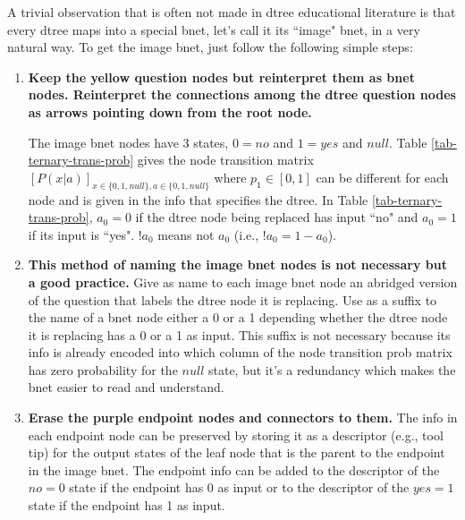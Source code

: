 A trivial 
observation
that is often not made
in dtree educational literature
is that every dtree 
maps into a special bnet, 
let's call it
its ``image" bnet,
in a very natural way.
To get the
 image bnet, just follow the
following simple steps:
\begin{enumerate}
\item {\bf Keep
the yellow question nodes
but reinterpret them as bnet nodes.
Reinterpret the connections among
the dtree question nodes
 as arrows pointing
down from the root node.}

The image bnet nodes
have 3 states,  $0=no$ and
$1=yes$ and $null$.
Table \ref{tab-ternary-trans-prob}
gives the 
node transition matrix $[P(x|a)]_{
x\in \{0,1,null\}, 
a\in \{0,1,null\}}$
where $p_1\in[0,1]$ can be 
different for each node and is given
in the info that specifies    
the dtree. In Table 
\ref{tab-ternary-trans-prob},
$a_0= 0$ if the
dtree node being replaced has input
``no" and $a_0=1$ if its 
input is ``yes".
$!a_0$ means not $a_0$ (i.e., $!a_0=1-a_0$).
\item
{\bf This method of naming
the image bnet nodes
is not necessary but a good practice.}
Give as name to each image bnet
node 
an abridged 
version of
the question
that labels the dtree node it is replacing.
Use as a suffix
to the name of a 
bnet node either a 0 or a 1
depending whether
the dtree node it is replacing
has a 0 or a 1 as input.
This suffix is not
necessary because its
info is already encoded
into
which column
of the node transition prob matrix has 
zero probability for the
$null$ state, but
it's  a redundancy which makes
the bnet easier to read and understand.
\item {\bf Erase the purple endpoint
nodes and connectors to them.} The
info in each  endpoint node
can be preserved
by storing it
as a descriptor (e.g., tool tip)
for the output
states of the
leaf node that 
is the parent
to the endpoint 
in the image bnet.
The
endpoint info can
be added to the descriptor of
the $no=0$ state if the
endpoint has 0 as input 
or to the descriptor
of the $yes=1$ state if 
the endpoint has 1 as input.
\end{enumerate}


